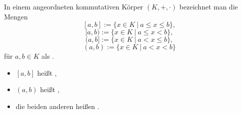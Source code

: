 In einem angeordneten kommutativen Körper $(K, +, \cdot)$ bezeichnet man die Mengen
$$[a, b] := \{x \in K \ | \ a \leq x \leq b \},$$
$$[a, b) := \{x \in K \ | \ a \leq x < b \},$$
$$(a, b] := \{x \in K \ | \ a < x \leq b \},$$
$$(a, b) := \{x \in K \ | \ a < x < b \}$$
für $a, b \in K$ als .
\begin{itemize}
    \item $[a, b]$ heißt ,
    \item $(a, b)$ heißt ,
    \item die beiden anderen heißen .
\end{itemize}